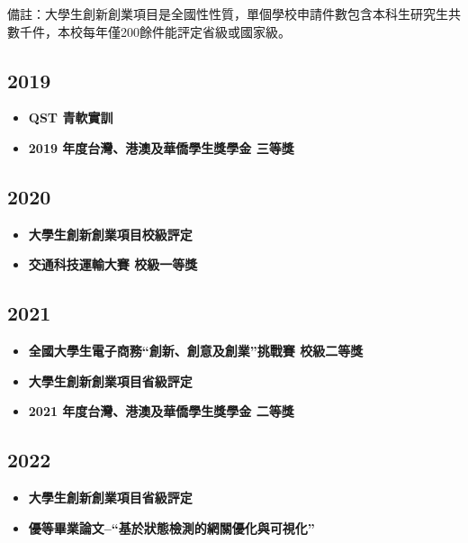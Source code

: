 \documentclass[classical]{einfart}
\begin{document}
備註：大學生創新創業項目是全國性性質，單個學校申請件數包含本科生研究生共數千件，本校每年僅200餘件能評定省級或國家級。

\subsection{2019}

\begin{itemize}[parsep=0.5ex]
  \item \textbf{QST 青軟實訓}

  \item \textbf{2019 年度台灣、港澳及華僑學生獎學金 \quad 三等獎}
\end{itemize}

\subsection{2020}

\begin{itemize}[parsep=0.5ex]
  \item \textbf{大學生創新創業項目校級評定}

  \item \textbf{交通科技運輸大賽 \quad 校級一等獎}
\end{itemize}

\subsection{2021}

\begin{itemize}[parsep=0.5ex]
  \item \textbf{全國大學生電子商務“創新、創意及創業”挑戰賽 \quad 校級二等獎}

  \item \textbf{大學生創新創業項目省級評定}
  
  \item \textbf{2021 年度台灣、港澳及華僑學生獎學金 \quad 二等獎}
\end{itemize}

\subsection{2022}

\begin{itemize}[parsep=0.5ex]
  \item \textbf{大學生創新創業項目省級評定}

  \item \textbf{優等畢業論文--“基於狀態檢測的網關優化與可視化”}
\end{itemize}
\end{document}
